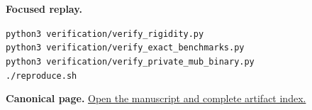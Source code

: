 \documentclass[11pt]{article}
\begin{document}
\textbf{Focused replay.}
\begin{center}\small
\texttt{python3 verification/verify\_rigidity.py}\\
\texttt{python3 verification/verify\_exact\_benchmarks.py}\\
\texttt{python3 verification/verify\_private\_mub\_binary.py}\\
\texttt{./reproduce.sh}
\end{center}

\textbf{Canonical page.}
\href{https://aleckriebel.github.io/Math/papers/cyclic-bell-exact-values-and-randomness/}
{Open the manuscript and complete artifact index.}
\end{document}
